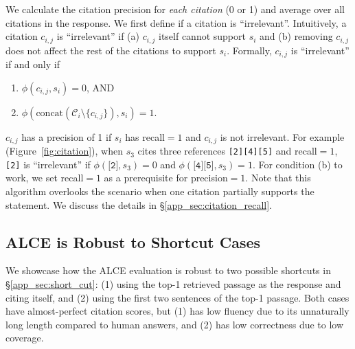 \documentclass[11pt]{article}
\newcommand\ttt[1]{\texttt{#1}}
\newcommand{\citeeval}{ALCE}
\begin{document}
We calculate the citation precision for \textit{each citation} (0 or 1) and
average over all {citations} in the response. %
We first define if a citation is ``irrelevant''.
Intuitively, a citation $c_{i,j}$ is ``irrelevant'' if (a) $c_{i,j}$ itself cannot support $s_i$ and (b) removing $c_{i,j}$ does not affect the rest of the citations to support $s_i$. Formally, $c_{i,j}$ is ``irrelevant'' if and only if
\begin{enumerate}[itemsep=0pt,leftmargin=2em,label=(\alph*)]
        \item  $\phi(c_{i,j},s_i)=0$, AND
        \item  $\phi(\text{concat}(\mathcal{C}_i \setminus \{c_{i,j}\}), s_i)=1$.  
\end{enumerate}
$c_{i,j}$ has a precision  of 1 if $s_i$ has recall$=$$1$ and $c_{i,j}$ is not irrelevant.
For example (Figure~\ref{fig:citation}), when $s_3$ cites three references \ttt{[2][4][5]} and recall$=$$1$,
\ttt{[2]} is ``irrelevant'' if $\phi(\texttt{[2]}, s_3)=0$ and $\phi(\texttt{[4][5]}, s_3)=1$.
For condition (b) to work, we set recall$=$$1$ as a prerequisite for precision$=1$. Note that this algorithm overlooks the scenario when one citation partially supports the statement. 
We discuss the details in \S\ref{app_sec:citation_recall}.









\subsection{\citeeval{} is Robust to Shortcut Cases}
We showcase how the \citeeval{} evaluation is robust to two possible shortcuts in \S\ref{app_sec:short_cut}:
(1) using the top-1 retrieved passage as the response and citing itself, 
and (2) using the first two sentences of the top-1 passage.
Both cases have almost-perfect citation scores, but (1) has low fluency due to its unnaturally long length compared to human answers, and (2) has low correctness due to low coverage.
\end{document}
